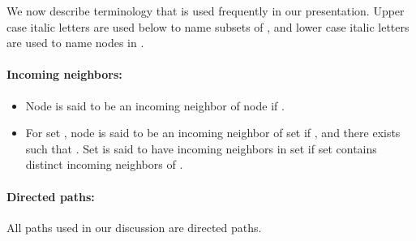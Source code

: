 \documentclass[letterpaper, 11pt]{article}
\begin{document}
We now describe terminology that is used frequently in our presentation. Upper case italic letters are used below to name subsets of ,
and lower case italic letters are used to name nodes in .

\paragraph{Incoming neighbors:}

\begin{itemize}
\item Node  is said to be an incoming neighbor of node  if .
\item
For set , node  is said to be an incoming
neighbor of set  if , and there exists 
such that . Set  is said to have  incoming neighbors in set  if set  contains  distinct incoming neighbors of .

\end{itemize}

\paragraph{Directed paths:}
All paths used in our discussion are directed paths.
\end{document}
